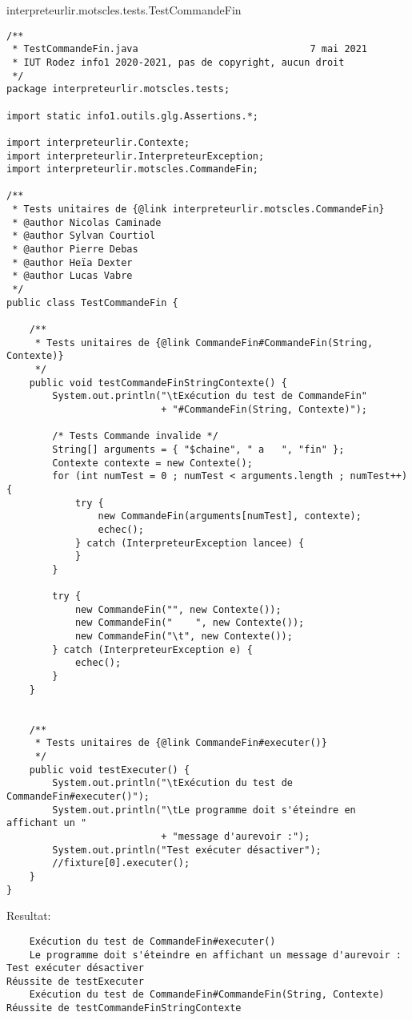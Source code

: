 \begin{enum}
    \item interpreteurlir.motscles.tests.TestCommandeFin
\begin{verbatim}
/**
 * TestCommandeFin.java                              7 mai 2021
 * IUT Rodez info1 2020-2021, pas de copyright, aucun droit
 */
package interpreteurlir.motscles.tests;

import static info1.outils.glg.Assertions.*;

import interpreteurlir.Contexte;
import interpreteurlir.InterpreteurException;
import interpreteurlir.motscles.CommandeFin;

/**
 * Tests unitaires de {@link interpreteurlir.motscles.CommandeFin}
 * @author Nicolas Caminade
 * @author Sylvan Courtiol
 * @author Pierre Debas
 * @author Heïa Dexter
 * @author Lucas Vabre
 */
public class TestCommandeFin {
    
    /**
     * Tests unitaires de {@link CommandeFin#CommandeFin(String, Contexte)}
     */
    public void testCommandeFinStringContexte() {
        System.out.println("\tExécution du test de CommandeFin"
                           + "#CommandeFin(String, Contexte)");
        
        /* Tests Commande invalide */
        String[] arguments = { "$chaine", " a   ", "fin" };
        Contexte contexte = new Contexte();
        for (int numTest = 0 ; numTest < arguments.length ; numTest++) {
            try {
                new CommandeFin(arguments[numTest], contexte);
                echec();
            } catch (InterpreteurException lancee) { 
            }
        }
        
        try {
            new CommandeFin("", new Contexte());
            new CommandeFin("    ", new Contexte());
            new CommandeFin("\t", new Contexte());
        } catch (InterpreteurException e) {
            echec();
        }
    }
    
    
    /**
     * Tests unitaires de {@link CommandeFin#executer()}
     */
    public void testExecuter() {
        System.out.println("\tExécution du test de CommandeFin#executer()");
        System.out.println("\tLe programme doit s'éteindre en affichant un "
                           + "message d'aurevoir :");
        System.out.println("Test exécuter désactiver");
        //fixture[0].executer();
    }
}
\end{verbatim}
Resultat:
\begin{verbatim}
    Exécution du test de CommandeFin#executer()
    Le programme doit s'éteindre en affichant un message d'aurevoir :
Test exécuter désactiver
Réussite de testExecuter
    Exécution du test de CommandeFin#CommandeFin(String, Contexte)
Réussite de testCommandeFinStringContexte
\end{verbatim}


\end{enum}
